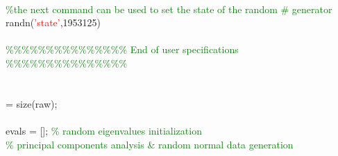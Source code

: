 \hspace{1mm}\indent \indent \indent \indent \indent \indent \indent \indent  \\ 
\hspace{1mm}\indent \indent \indent \indent \indent \indent \indent \indent \textcolor{green}{\%the next command can be used to set the state of the random # generator }\\ 
\hspace{1mm}\indent \indent \indent \indent \indent \indent \indent \indent randn(\textcolor{red}{'state'},1953125) \\ 
\hspace{1mm}\indent \indent \indent \indent \indent \indent \indent \indent  \\ 
\hspace{1mm}\indent \indent \indent \indent \indent \indent \indent \indent \textcolor{green}{\%}\textcolor{green}{\%}\textcolor{green}{\%}\textcolor{green}{\%}\textcolor{green}{\%}\textcolor{green}{\%}\textcolor{green}{\%}\textcolor{green}{\%}\textcolor{green}{\%}\textcolor{green}{\%}\textcolor{green}{\%}\textcolor{green}{\%}\textcolor{green}{\%}\textcolor{green}{\%}\textcolor{green}{\% End of user specifications }\textcolor{green}{\%}\textcolor{green}{\%}\textcolor{green}{\%}\textcolor{green}{\%}\textcolor{green}{\%}\textcolor{green}{\%}\textcolor{green}{\%}\textcolor{green}{\%}\textcolor{green}{\%}\textcolor{green}{\%}\textcolor{green}{\%}\textcolor{green}{\%}\textcolor{green}{\%}\textcolor{green}{\%}\textcolor{green}{\% }\\ 
\hspace{1mm}\indent \indent \indent \indent \indent \indent \indent \indent  \\ 
\hspace{1mm}\indent \indent \indent \indent \indent \indent \indent \indent  \\ 
\hspace{1mm}\indent \indent \indent \indent \indent \indent \indent {} = size(raw); \\ 
\hspace{1mm}\indent \indent \indent \indent \indent \indent \indent \indent  \\ 
\hspace{1mm}\indent \indent \indent \indent \indent \indent \indent \indent evals = []; \textcolor{green}{\% random eigenvalues initialization }\\ 
\hspace{1mm}\indent \indent \indent \indent \indent \indent \indent \indent \textcolor{green}{\% principal components analysis \& random normal data generation }\\ 
